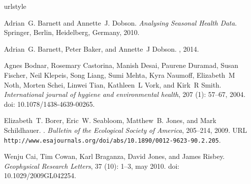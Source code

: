 \documentclass[11pt,a4paper]{article}
\begin{document}
\clearpage
\renewcommand\refname{{References for appendix 2}} 
%
%

\begin{thebibliography}{30}
\providecommand{\natexlab}[1]{#1}
\providecommand{\url}[1]{\texttt{#1}}
\expandafter\ifx\csname urlstyle\endcsname\relax
  \providecommand{\doi}[1]{doi: #1}\else
  \providecommand{\doi}{doi: \begingroup \urlstyle{rm}\Url}\fi

Adrian~G. Barnett and Annette~J. Dobson.
\newblock \emph{{Analysing Seasonal Health Data}}.
\newblock Springer, Berlin, Heidelberg, Germany, 2010.

Adrian~G. Barnett, Peter Baker, and Annette~J Dobson.
, 2014.

Agnes Bodnar, Rosemary Castorina, Manish Desai, Paurene Duramad, Susan Fischer,
  Neil Klepeis, Song Liang, Sumi Mehta, Kyra Naumoff, Elizabeth~M Noth, Morten
  Schei, Linwei Tian, Kathleen~L Vork, and Kirk~R Smith.
\newblock \emph{International journal of hygiene and environmental health},
  207 (1): 57--67, 2004.
\newblock \doi{10.1078/1438-4639-00265}.

Elizabeth~T. Borer, Eric~W. Seabloom, Matthew~B. Jones, and Mark Schildhauer.
.
\newblock \emph{Bulletin of the Ecological Society of America}, 
   205--214, 2009.
\newblock URL
  \url{http://www.esajournals.org/doi/abs/10.1890/0012-9623-90.2.205}.

Wenju Cai, Tim Cowan, Karl Braganza, David Jones, and James Risbey.
\newblock \emph{Geophysical Research Letters}, 37 (10): 1--3,
  may 2010.
\newblock \doi{10.1029/2009GL042254}.


\end{thebibliography}
\end{document}
